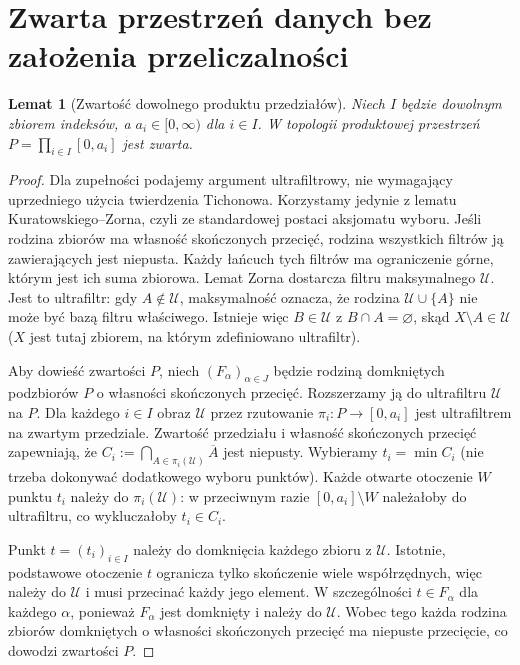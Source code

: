 \documentclass[11pt,a4paper,oneside]{book}
\numberwithin{equation}{chapter}
\theoremstyle{plain}
\newtheorem{lemat}[twierdzenie]{Lemat}
\theoremstyle{definition}
\theoremstyle{remark}
\begin{document}
\section{Zwarta przestrzeń danych bez założenia przeliczalności}
\begin{lemat}[Zwartość dowolnego produktu przedziałów]
\label{lem:haar-product-compact-23}
Niech $I$ będzie dowolnym zbiorem indeksów, a
$a_i\in[0,\infty)$ dla $i\in I$. W topologii produktowej
przestrzeń $P=\prod_{i\in I}[0,a_i]$ jest zwarta.
\end{lemat}
\begin{proof}
Dla zupełności podajemy argument ultrafiltrowy, nie wymagający
uprzedniego użycia twierdzenia Tichonowa. Korzystamy jedynie
z lematu Kuratowskiego--Zorna, czyli ze standardowej postaci
aksjomatu wyboru. Jeśli rodzina zbiorów ma własność skończonych
przecięć, rodzina wszystkich filtrów ją zawierających jest
niepusta. Każdy łańcuch tych filtrów ma ograniczenie górne,
którym jest ich suma zbiorowa. Lemat Zorna dostarcza filtru
maksymalnego $\mathcal U$. Jest to ultrafiltr: gdy $A\notin\mathcal U$, maksymalność oznacza, że
rodzina $\mathcal U\cup\{A\}$ nie może być bazą filtru
właściwego. Istnieje więc $B\in\mathcal U$ z
$B\cap A=\varnothing$, skąd $X\setminus A\in\mathcal U$
($X$ jest tutaj zbiorem, na którym zdefiniowano ultrafiltr).

Aby dowieść zwartości $P$, niech $(F_\alpha)_{\alpha\in J}$
będzie rodziną domkniętych podzbiorów $P$ o własności
skończonych przecięć. Rozszerzamy ją do ultrafiltru
$\mathcal U$ na $P$. Dla każdego $i\in I$ obraz
$\mathcal U$ przez rzutowanie $\pi_i:P\to[0,a_i]$
jest ultrafiltrem na zwartym przedziale. Zwartość przedziału
i własność skończonych przecięć zapewniają, że
$C_i:=\bigcap_{A\in\pi_i(\mathcal U)}\overline A$ jest niepusty.
Wybieramy $t_i=\min C_i$ (nie trzeba dokonywać dodatkowego
wyboru punktów). Każde otwarte otoczenie $W$ punktu $t_i$
należy do $\pi_i(\mathcal U)$: w przeciwnym razie
$[0,a_i]\setminus W$ należałoby do ultrafiltru,
co wykluczałoby $t_i\in C_i$.

Punkt $t=(t_i)_{i\in I}$ należy do domknięcia każdego
zbioru z $\mathcal U$. Istotnie, podstawowe otoczenie
$t$ ogranicza tylko skończenie wiele współrzędnych,
więc należy do $\mathcal U$ i musi przecinać każdy
jego element. W szczególności $t\in F_\alpha$ dla
każdego $\alpha$, ponieważ $F_\alpha$ jest domknięty
i należy do $\mathcal U$. Wobec tego każda rodzina
zbiorów domkniętych o własności skończonych przecięć
ma niepuste przecięcie, co dowodzi zwartości $P$.
\end{proof}
\end{document}
